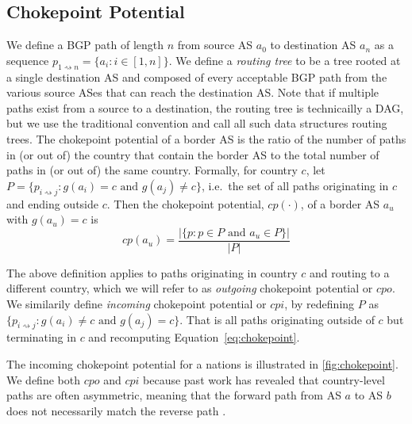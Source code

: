 \subsection{Chokepoint Potential}

We define a BGP path of length $n$ from source AS $a_0$ to destination AS $a_n$
as a sequence $p_{1\rightsquigarrow n} = \{a_i : i \in [1,n]\}$.  We define a
\textit{routing tree} to be a tree rooted at a single destination AS and
composed of every acceptable BGP path from the various source ASes that can
reach the destination AS. Note that if multiple paths exist from a source
to a destination, the routing tree is technicailly a DAG, but we use the traditional convention and call
all such data structures routing trees. The
chokepoint potential of a border AS is the ratio of the number of paths in (or out of) the country that contain the border AS to
the total number of paths in (or out of) the same country.
Formally, for country $c$, let $P = \{p_{i \rightsquigarrow
j} : g(a_i)=c \text{ and } g(a_j)\neq c\} $, i.e.\ the set of all paths
originating in $c$ and ending outside $c$. Then the chokepoint potential,
$cp(\cdot)$, of a border AS $a_u$ with $g(a_u) = c$ is
\begin{equation}
  \label{eq:chokepoint}
  cp(a_u) = \frac{|\{p: p \in P \text{ and } a_u \in P\}|}{|P|}
\end{equation}


The above definition applies to paths originating in country
$c$ and routing to a different country, which we will refer to as
\textit{outgoing} chokepoint potential or $cpo$. We similarily define
\textit{incoming} chokepoint potential or $cpi$, by redefining $P$ as $\{p_{i
\rightsquigarrow j}: g(a_i) \neq c \text{ and } g(a_j) = c\}$. That is all
paths originating outside of $c$ but terminating in $c$ and recomputing
Equation~\ref{eq:chokepoint}. 

The incoming chokepoint
potential for a nations is illustrated in \figurename
\ref{fig:chokepoint}. We define both $cpo$ and $cpi$ because past work
has revealed that country-level paths are often asymmetric, meaning that the
forward path from AS $a$ to AS $b$ does not necessarily match the reverse path
\cite{characterizingAndAvoiding}.

